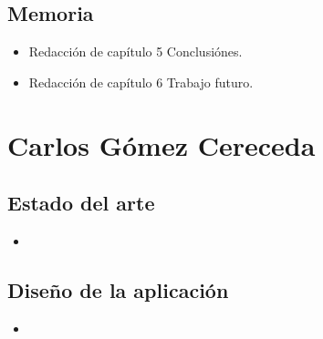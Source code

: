     \subsection{Memoria}
    \label{makereference7.2.3}
        \begin{itemize}
            \item Redacción de capítulo 5 Conclusiónes.
            \item Redacción de capítulo 6 Trabajo futuro.
        \end{itemize}

\section{Carlos Gómez Cereceda}
\label{makereference7.3}
    \subsection{Estado del arte}
    \label{makereference7.3.1}
        \begin{itemize}
            \item
        \end{itemize}
    \subsection{Diseño de la aplicación}
    \label{makereference7.3.2}
        \begin{itemize}
            \item
        \end{itemize}
